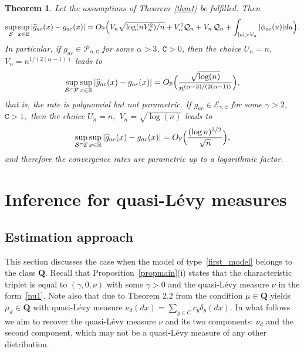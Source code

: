 \documentclass[numbers,webpdf,imaiai]{ima-authoring-template}%
\theoremstyle{thmstyletwo}%
\newtheorem{theorem}{Theorem}%
\newcommand{\R}{\mathbb{R}}
\renewcommand{\P}{\mathbb{P}}
\newcommand{\Q}{\pmb{Q}}
\newcommand{\mQ}{\mathcal{Q}}
\numberwithin{equation}{section}
\begin{document}
\begin{theorem}\label{thm2}
Let the assumptions of Theorem~\ref{thm1} be fulfilled. Then 
\begin{align}\label{rateG}
\sup_{\mathcal{S}} \sup_{x \in \R} | 
 \widehat{g}_{ac}(x) -  g_{ac}(x) 
 | 
 = O_{\P}\Bigl( 
 V_n    \sqrt{
\log(n V_n^2) / n
}
 +V_n^2\mQ_n+V_n\,\mQ_n
+
 \int_{|u|>V_n} |\phi_{ac}(u)|du
 \Bigr).
\end{align}
In particular, if \(g_{ac} \in \mathcal{P}_{\alpha,\mathtt{C}}\) for some \(\alpha > 3\), \(\mathtt{C}>0\), then the choice \(U_n =n,\) \(V_n = n^{1/(2(\alpha-1))}\) leads to 
\begin{align}\label{rateP}
\sup_{\mathcal{S} \cap \mathcal{P}} \sup_{x \in \R} | 
 \widehat{g}_{ac}(x) -  g_{ac}(x) 
 | 
 = O_{\P}\Bigl( 
 \frac{\sqrt{\log(n)}}{n^{(\alpha-3)/(2(\alpha-1))}}
 \Bigr),
\end{align}
that is, the rate is polynomial but not parametric. If \(g_{ac} \in \mathcal{E}_{\gamma,\mathtt{C}}\) for some \(\gamma > 2\), \(\mathtt{C}>1,\) then the choice \(U_n =n,\) \(V_n = \sqrt{\log(n)}\) leads to 
\begin{align}\label{rateE}
\sup_{\mathcal{S}\cap{\mathcal{E}}} \sup_{x \in \R} | 
 \widehat{g}_{ac}(x) -  g_{ac}(x) 
 | 
 = O_{\P}\Bigl( 
 \frac{(\log n)^{3/2}}{\sqrt{n}}
 \Bigr),
\end{align}
and therefore the convergence rates are parametric up to a logarithmic factor.
\end{theorem}

\section{Inference for quasi-L{\'e}vy measures} \label{secqid}

\subsection{Estimation approach}\label{secest2}
This section discusses the case when the model of type~\eqref{first_model} belongs to the class \(\Q\). Recall that Proposition~\ref{propmain}(i) states that  the characteristic triplet is equal to \((\gamma,0, \nu)\) with some \(\gamma>0\) and  the quasi-L{\'e}vy measure \(\nu\) in the form~\eqref{nu1}. Note also that due to Theorem 2.2 from \cite{BK2023} the condition $\mu \in \Q$ yields $\mu_d \in \Q$ with quasi-L{\'e}vy measure \(\nu_d(dx)=\sum_{y \in C} c_y \delta_y (dx)\). In what follows we aim to recover the quasi-L{\'e}vy measure \(\nu\) and its two components: \(\nu_d\) and the second component, which may not be a quasi-L{\'e}vy measure of any other distribution. 
\end{document}
